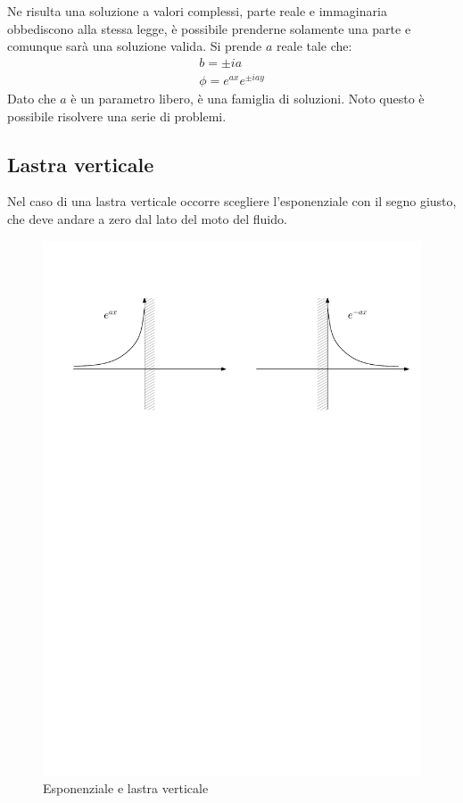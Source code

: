 %
Ne risulta una soluzione a valori complessi, parte reale e immaginaria obbediscono alla stessa legge, è possibile prenderne solamente una parte e comunque sarà una soluzione valida.
Si prende $a$ reale tale che:
%
	\begin{equation*}
		\begin{gathered}
			b = \pm ia\\
			\phi = e^{ax} e^{\pm iay}
		\end{gathered}
	\end{equation*}
%
Dato che $a$ è un parametro libero, è una famiglia di soluzioni.
Noto questo è possibile risolvere una serie di problemi.

\subsection{Lastra verticale} 
Nel caso di una lastra verticale occorre scegliere l'esponenziale con il segno giusto, che deve andare a zero dal lato del moto del fluido.
	\begin{figure}[ht]
		\includegraphics[scale=0.6]{./7.3 Flusso irrotazionale/7.3-1}
		\centering
		\caption{Esponenziale e lastra verticale}
	\end{figure}

